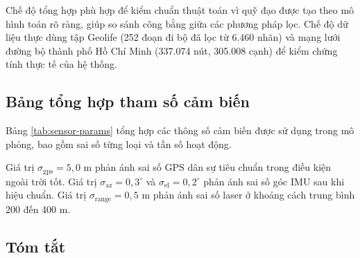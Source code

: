 Chế độ tổng hợp phù hợp để kiểm chuẩn thuật toán vì quỹ đạo được tạo theo mô hình toán rõ ràng, giúp so sánh công bằng giữa các phương pháp lọc. Chế độ dữ liệu thực dùng tập Geolife (252 đoạn đi bộ đã lọc từ 6.460 nhãn) và mạng lưới đường bộ thành phố Hồ Chí Minh (337.074 nút, 305.008 cạnh) để kiểm chứng tính thực tế của hệ thống.

\subsection{Bảng tổng hợp tham số cảm biến}

\hspace{0.5cm} Bảng \ref{tab:sensor-params} tổng hợp các thông số cảm biến được sử dụng trong mô phỏng, bao gồm sai số từng loại và tần số hoạt động.

\begin{table}[H]
\centering
\caption{Tham số cảm biến mô phỏng}
\label{tab:sensor-params}
\end{table}

Giá trị $\sigma_{\text{gps}} = 5{,}0$ m phản ánh sai số GPS dân sự tiêu chuẩn trong điều kiện ngoài trời tốt. Giá trị $\sigma_{\text{az}} = 0{,}3^\circ$ và $\sigma_{\text{el}} = 0{,}2^\circ$ phản ánh sai số góc IMU sau khi hiệu chuẩn. Giá trị $\sigma_{\text{range}} = 0{,}5$ m phản ánh sai số laser ở khoảng cách trung bình 200 đến 400 m.

\subsection{Tóm tắt}

